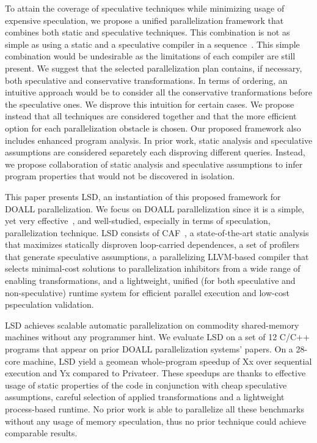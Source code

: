 To attain the coverage of speculative techniques while minimizing usage of
expensive speculation,
we propose a unified parallelization framework that combines both static and
speculative techniques.
%
This combination is not as simple as using a static and a speculative compiler
in a sequence~\cite{clusterDOALL,...}. This simple combination would be
undesirable as the limitations of each compiler are still present.
%
We suggest that the selected parallelization plan contains, if necessary, both
speculative and conservative transformations.
%
In terms of ordering, an intuitive approach would be to consider all the
conservative tranformations before the speculative ones. We disprove this
intuition for certain cases. We propose instead that all techniques are
considered together and that the more efficient option for each parallelization
obstacle is chosen.
%
Our proposed framework also includes enhanced program analysis.  In prior work,
static analysis and speculative assumptions are considered separetely each
disproving different queries. Instead, we propose collaboration of static
analysis and speculative assumptions to infer program properties that would not
be discovered in isolation.


This paper presents LSD, an instantiation of this proposed framework for DOALL
parallelization. We focus on DOALL parallelization since it is a simple, yet
very effective~\cite{Uncovering Mahlke paper}, and well-studied, especially in
terms of speculation, parallelization technique.
%
LSD consists of CAF~\cite{..}, a state-of-the-art static analysis that maximizes
statically disproven loop-carried dependences, a set of profilers that generate
speculative assumptions, a parallelizing LLVM-based compiler that selects
minimal-cost solutions to parallelization inhibitors from a wide range of
enabling transformations, and a lightweight, unified (for both speculative and
non-speculative) runtime system for efficient parallel execution and low-cost
pspeculation validation.
%

LSD achieves scalable automatic parallelization on commodity shared-memory
machines without any programmer hint.  We evaluate LSD on a set of 12 C/C++
programs that appear on prior DOALL parallelization systems' papers. On a
28-core machine, LSD yield a geomean whole-program speedup of Xx over sequential
execution and Yx compared to Privateer.
These speedups are thanks to effective usage of static properties of the code in
conjunction with cheap speculative assumptions, careful selection of applied
transformations and a lightweight process-based runtime.  No prior work is able
to parallelize all these benchmarks without any usage of memory speculation,
thus no prior technique could achieve comparable results.
